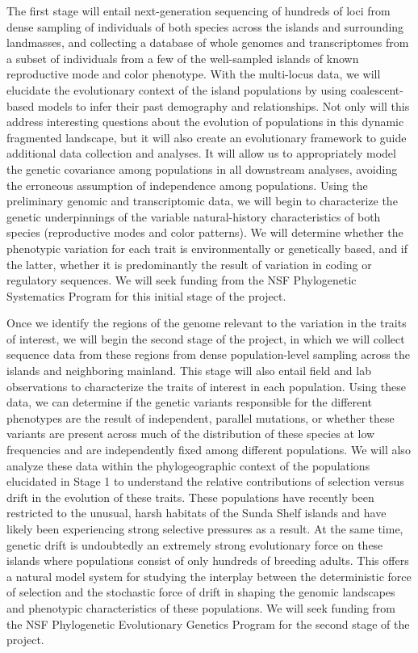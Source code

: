 \documentclass[10pt]{article}
\begin{document}
The first stage will entail next-generation sequencing of hundreds of loci from
dense sampling of individuals of both species across the islands and
surrounding landmasses, and collecting a database of whole genomes and
transcriptomes from a subset of individuals from a few of the well-sampled
islands of known reproductive mode and color phenotype.
With the multi-locus data, we will elucidate the evolutionary context of the
island populations by using coalescent-based models to infer their past
demography and relationships.
Not only will this address interesting questions about the evolution of
populations in this dynamic fragmented landscape, but it will also create an
evolutionary framework to guide additional data collection and analyses.
It will allow us to appropriately model the genetic covariance among
populations in all downstream analyses, avoiding the erroneous assumption of
independence among populations.
Using the preliminary genomic and transcriptomic data, we will begin to
characterize the genetic underpinnings of the variable natural-history
characteristics of both species (reproductive modes and color patterns).
We will determine whether the phenotypic variation for each trait is
environmentally or genetically based, and if the latter, whether it is
predominantly the result of variation in coding or regulatory sequences.
We will seek funding from the NSF Phylogenetic Systematics Program for this
initial stage of the project.

Once we identify the regions of the genome relevant to the variation in the
traits of interest, we will begin the second stage of the project, in which we
will collect sequence data from these regions from dense population-level
sampling across the islands and neighboring mainland.
This stage will also entail field and lab observations to characterize the
traits of interest in each population.
Using these data, we can determine if the genetic variants responsible for the
different phenotypes are the result of independent, parallel mutations, or
whether these variants are present across much of the distribution of these
species at low frequencies and are independently fixed among different
populations.
We will also analyze these data within the phylogeographic context of the
populations elucidated in Stage 1 to understand the relative contributions of
selection versus drift in the evolution of these traits.
These populations have recently been restricted to the unusual, harsh habitats
of the Sunda Shelf islands and have likely been experiencing strong selective
pressures as a result.
At the same time, genetic drift is undoubtedly an extremely strong evolutionary
force on these islands where populations consist of only hundreds of
breeding adults.
This offers a natural model system for studying the interplay between the
deterministic force of selection and the stochastic force of drift in shaping
the genomic landscapes and phenotypic characteristics of these populations.
We will seek funding from the NSF Phylogenetic Evolutionary Genetics Program
for the second stage of the project.
\end{document}
